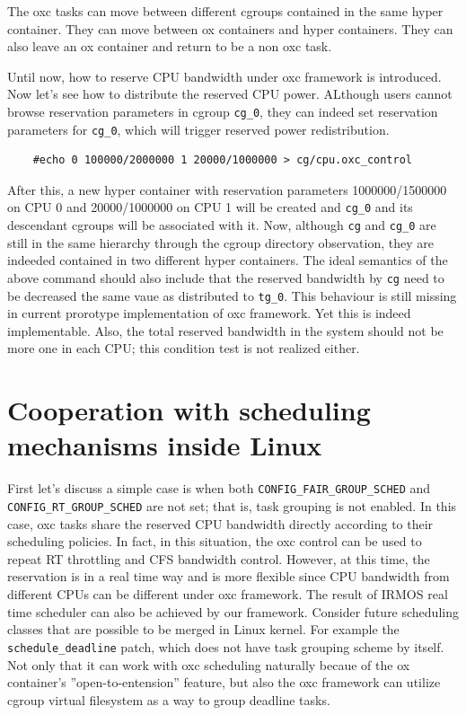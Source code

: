 The oxc tasks can move between different cgroups contained in the same 
hyper container. They can move between ox containers and hyper containers.
They can also leave an ox container and return to be a non oxc task.

Until now, how to reserve CPU bandwidth under oxc framework is introduced.
Now let's see how to distribute the reserved CPU power.
ALthough users cannot browse reservation parameters in cgroup
\texttt{cg\_0}, they can indeed set reservation parameters for 
\texttt{cg\_0}, which will trigger reserved power redistribution.
\begin{lstlisting}
	#echo 0 100000/2000000 1 20000/1000000 > cg/cpu.oxc_control
\end{lstlisting}
After this, a new hyper container with reservation parameters
1000000/1500000 on CPU 0 and 20000/1000000 on CPU 1 will be created
and \texttt{cg\_0} and its descendant cgroups will be associated with
it. Now, although \texttt{cg} and \texttt{cg\_0} are still in the same
hierarchy through the cgroup directory observation, they are indeeded 
contained in two different hyper containers.
The ideal semantics of the above command should also include that the 
reserved bandwidth by \texttt{cg} need to be decreased the same vaue as 
distributed to \texttt{tg\_0}. This behaviour is still missing in current 
prorotype implementation of oxc framework. Yet this is indeed implementable.
Also, the total reserved bandwidth in the system should not be more one in
each CPU; this condition test is not realized either.

\section{Cooperation with scheduling mechanisms inside Linux}

First let's discuss a simple case is when both
\texttt{CONFIG\_FAIR\_GROUP\_SCHED} and \texttt{CONFIG\_RT\_GROUP\_SCHED} 
are not set; that is, task grouping is not 
enabled. In this case, oxc tasks share the reserved CPU bandwidth directly
according to their scheduling policies. In fact, in this situation, the oxc 
control can be used to repeat RT throttling and CFS bandwidth control. 
However, at this time, the reservation is in a real time way and is more 
flexible since CPU bandwidth from different CPUs can be different under 
oxc framework. The result of IRMOS real time scheduler can also be achieved 
by our framework. Consider future scheduling classes that are possible to 
be merged in Linux kernel. For example the \texttt{schedule\_deadline} 
patch, which does not have task grouping scheme by itself. 
Not only that it can work with oxc scheduling naturally becaue of the
ox container's ''open-to-entension'' feature, but also the oxc framework 
can utilize cgroup virtual filesystem as a way to group deadline tasks. 

